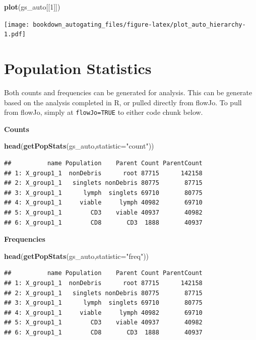 \documentclass[]{book}
\newenvironment{Shaded}{\begin{snugshade}}{\end{snugshade}}
\newcommand{\DataTypeTok}[1]{\textcolor[rgb]{0.13,0.29,0.53}{#1}}
\newcommand{\DecValTok}[1]{\textcolor[rgb]{0.00,0.00,0.81}{#1}}
\newcommand{\KeywordTok}[1]{\textcolor[rgb]{0.13,0.29,0.53}{\textbf{#1}}}
\newcommand{\NormalTok}[1]{#1}
\newcommand{\StringTok}[1]{\textcolor[rgb]{0.31,0.60,0.02}{#1}}
\begin{document}
\begin{Shaded}
\begin{Highlighting}[]
\KeywordTok{plot}\NormalTok{(gs_auto[[}\DecValTok{1}\NormalTok{]])}
\end{Highlighting}
\end{Shaded}

\texttt{[image: bookdown\_autogating\_files/figure-latex/plot\_auto\_hierarchy-1.pdf]}

\hypertarget{population-statistics}{%
\section{Population Statistics}\label{population-statistics}}

Both counts and frequencies can be generated for analysis. This can be generate based on the analysis completed in R, or pulled directly from flowJo. To pull from flowJo, simply at \texttt{flowJo=TRUE} to either code chunk below.

\textbf{Counts}

\begin{Shaded}
\begin{Highlighting}[]
\KeywordTok{head}\NormalTok{(}\KeywordTok{getPopStats}\NormalTok{(gs_auto,}\DataTypeTok{statistic=}\StringTok{"count"}\NormalTok{))}
\end{Highlighting}
\end{Shaded}

\begin{verbatim}
##          name Population    Parent Count ParentCount
## 1: X_group1_1  nonDebris      root 87715      142158
## 2: X_group1_1   singlets nonDebris 80775       87715
## 3: X_group1_1      lymph  singlets 69710       80775
## 4: X_group1_1     viable     lymph 40982       69710
## 5: X_group1_1        CD3    viable 40937       40982
## 6: X_group1_1        CD8       CD3  1888       40937
\end{verbatim}

\textbf{Frequencies}

\begin{Shaded}
\begin{Highlighting}[]
\KeywordTok{head}\NormalTok{(}\KeywordTok{getPopStats}\NormalTok{(gs_auto,}\DataTypeTok{statistic=}\StringTok{"freq"}\NormalTok{))}
\end{Highlighting}
\end{Shaded}

\begin{verbatim}
##          name Population    Parent Count ParentCount
## 1: X_group1_1  nonDebris      root 87715      142158
## 2: X_group1_1   singlets nonDebris 80775       87715
## 3: X_group1_1      lymph  singlets 69710       80775
## 4: X_group1_1     viable     lymph 40982       69710
## 5: X_group1_1        CD3    viable 40937       40982
## 6: X_group1_1        CD8       CD3  1888       40937
\end{verbatim}
\end{document}
